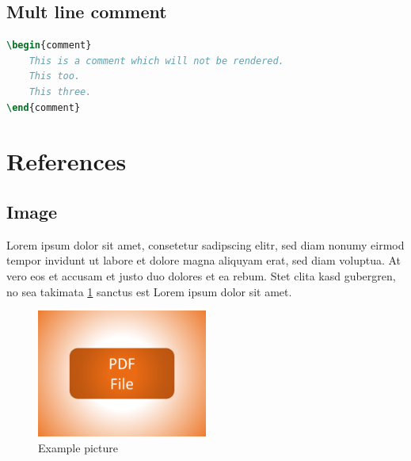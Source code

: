 \documentclass{article}				%
\begin{document}
\begin{lstlisting}[language=tex,frame=single]
% This is a one line comment which will not be rendered.
\end{lstlisting}

\subsection{Mult line comment}

\begin{lstlisting}[language=tex,frame=single]
\begin{comment}
	This is a comment which will not be rendered.
	This too.
	This three.
\end{comment}
\end{lstlisting}

\section{References}

\subsection{Image}

Lorem ipsum dolor sit amet, consetetur sadipscing elitr, sed diam nonumy eirmod tempor invidunt ut labore et dolore magna aliquyam erat, sed diam voluptua. At vero eos et accusam et justo duo dolores et ea rebum. Stet clita kasd gubergren, no sea takimata \ref{fig:example-pic} sanctus est Lorem ipsum dolor sit amet.

\begin{figure}[!h]
	\centering
	\includegraphics[width=0.5\textwidth]{example-resource-pdf-file.pdf}
	\caption{Example picture}
	\label{fig:example-pic}
\end{figure}
\end{document}
